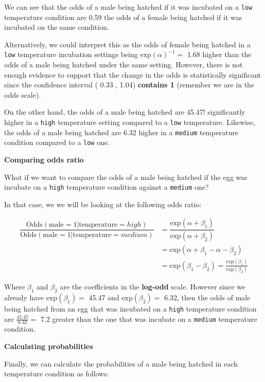 \documentclass[
  letterpaper,
  DIV=11,
  numbers=noendperiod]{scrartcl}
\begin{document}
We can see that the odds of a male being hatched if it was incubated on
a \texttt{low} temperature condition are 0.59 the odds of a female being
hatched if it was incubated on the same condition.

Alternatively, we could interpret this as the odds of female being
hatched in a \texttt{low} temperature incubation settings being
\(\mathrm{exp}(\alpha)^{-1} =\) 1.68 higher than the odds of a male
being hatched under the same setting. However, there is not enough
evidence to support that the change in the odds is statistically
significant since the confidence interval ( 0.33 , 1.04)
\textbf{contains 1} (remember we are in the odds scale).

On the other hand, the odds of a male being hatched are 45.47!
significantly higher in a \texttt{high} temperature setting compared to
a \texttt{low} temperature. Likewise, the odds of a male being hatched
are 6.32 higher in a \texttt{medium} temperature condition compared to a
\texttt{low} one.

\textbf{Comparing odds ratio}

What if we want to compare the odds of a male being hatched if the egg
was incubate on a \texttt{high} temperature condition against a
\texttt{medium} one?

In that case, we we will be looking at the following odds ratio:

\[
\begin{aligned}
\dfrac{\mathrm{Odds}(\mathrm{male}=1|\mathrm{temperature}=high)}{\mathrm{Odds}(\mathrm{male}=1|\mathrm{temperature}=medium)} &= \dfrac{\mathrm{exp}(\alpha+\beta_1)}{\mathrm{exp}(\alpha+\beta_2)} \\&= \mathrm{exp}(\alpha+\beta_1 - \alpha - \beta_2) \\&= \mathrm{exp}(\beta_1 - \beta_2) = \frac{\mathrm{exp}(\beta_1)}{ \mathrm{exp}(\beta_2)}
\end{aligned}
\]

Where \(\beta_1\) and \(\beta_2\) are the coefficients in the
\textbf{log-odd} scale. However since we already have
\(\mathrm{exp}(\beta_1)=\) 45.47 and \(\mathrm{exp}(\beta_2)=\) 6.32,
then the odds of male being hatched from an egg that was incubated on a
\texttt{high} temperature condition are \(\frac{45.47}{6.32}=\) 7.2
greater than the one that was incubate on a \texttt{medium} temperature
condition.

\textbf{Calculating probabilities}

Finally, we can calculate the probabilities of a male being hatched in
each temperature condition as follows:
\end{document}
